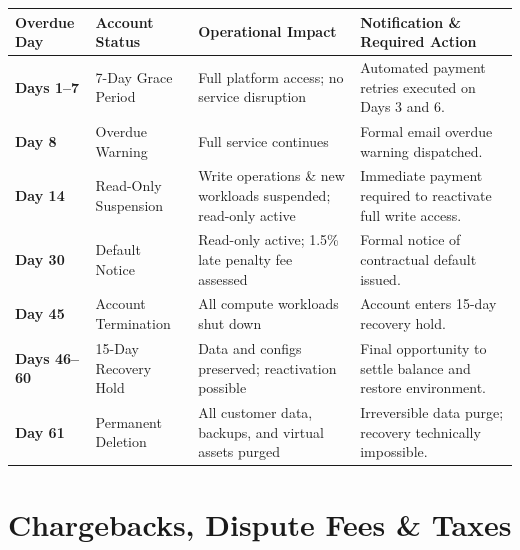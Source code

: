 \documentclass[10pt,letterpaper]{article}
\begin{document}
\newpage

\noindent
{\centering
\small
\begin{tabularx}{\linewidth}{@{}l l >{\raggedright\arraybackslash}p{4.2cm} >{\raggedright\arraybackslash}X@{}}
\toprule
\rowcolor{tablehead}
\color{white}\textbf{Overdue Day} & \color{white}\textbf{Account Status} & \color{white}\textbf{Operational Impact} & \color{white}\textbf{Notification \& Required Action} \\
\midrule
\rowcolor{rowalt}
\textbf{Days 1--7} & 7-Day Grace Period & Full platform access; no service disruption & Automated payment retries executed on Days 3 and 6. \\
\textbf{Day 8} & Overdue Warning & Full service continues & Formal email overdue warning dispatched. \\
\rowcolor{rowalt}
\textbf{Day 14} & Read-Only Suspension & Write operations \& new workloads suspended; read-only active & Immediate payment required to reactivate full write access. \\
\textbf{Day 30} & Default Notice & Read-only active; 1.5\% late penalty fee assessed & Formal notice of contractual default issued. \\
\rowcolor{rowalt}
\textbf{Day 45} & Account Termination & All compute workloads shut down & Account enters 15-day recovery hold. \\
\textbf{Days 46--60} & 15-Day Recovery Hold & Data and configs preserved; reactivation possible & Final opportunity to settle balance and restore environment. \\
\rowcolor{rowalt}
\textbf{Day 61} & Permanent Deletion & All customer data, backups, and virtual assets purged & Irreversible data purge; recovery technically impossible. \\
\bottomrule
\end{tabularx}
\label{tab:delinquency}
\par}

\vspace{3pt}

\section{Chargebacks, Dispute Fees \& Taxes}
\end{document}
